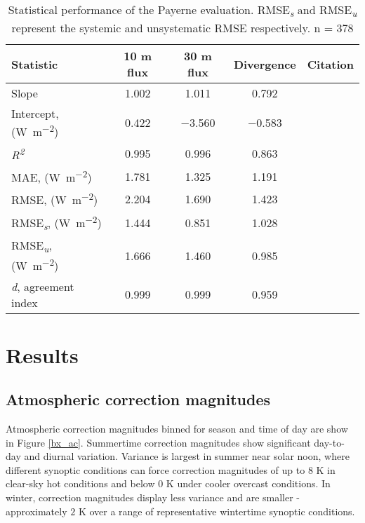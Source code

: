 \begin{table}[H]
	\centering
	\caption{Statistical performance of the Payerne evaluation. RMSE\textit{\textsubscript{s}} and RMSE\textit{\textsubscript{u}} represent the systemic and unsystematic RMSE respectively. n = 378}
	\label{evalstats}
	\begin{tabular*}{\textwidth}{l@{\extracolsep{\fill}} cccr}
		\toprule 
		Statistic & 10 \si{\meter} flux & 30 \si{\meter} flux & Divergence & Citation \\  \midrule
		Slope & 1.002 & 1.011 & 0.792 &  \\ 
		Intercept, (\si{\watt\per\meter\squared}) & 0.422 & $-$3.560 & $-$0.583 &   \\ 
		\textit{R\textsuperscript{2}} & 0.995 & 0.996 & 0.863 & \\ 
		MAE,  (\si{\watt\per\meter\squared}) & 1.781 & 1.325 & 1.191 & \citep{Willmott1985a} \\ 
		RMSE,  (\si{\watt\per\meter\squared}) & 2.204 & 1.690 & 1.423 & \citep{Willmott1985a} \\ 
		RMSE\textit{\textsubscript{s}},  (\si{\watt\per\meter\squared}) & 1.444 & 0.851 & 1.028 & \citep{Willmott1985a} \\ 
		RMSE\textit{\textsubscript{u}},  (\si{\watt\per\meter\squared}) & 1.666 & 1.460 & 0.985 & \citep{Willmott1985a} \\ 
		\textit{d}, agreement index & 0.999 & 0.999 & 0.959 & \citep{Willmott2012} \\
		\bottomrule
	\end{tabular*} 
\end{table}

\section{Results}

\subsection{Atmospheric correction magnitudes}

Atmospheric correction magnitudes binned for season and time of day are show in Figure \ref{bx_ac}. Summertime correction magnitudes show significant day-to-day and diurnal variation. Variance is largest in summer near solar noon, where different synoptic conditions can force correction magnitudes of up to $8$ \si{\kelvin} in clear-sky hot conditions and below $0$ \si{\kelvin} under cooler overcast conditions. In winter, correction magnitudes display less variance and are smaller - approximately $2$ \si{\kelvin} over a range of representative wintertime synoptic conditions. 

